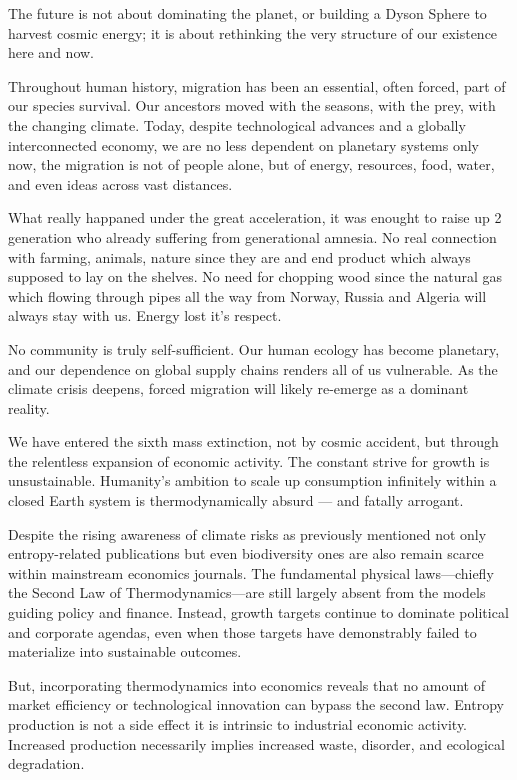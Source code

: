 \documentclass[a4paper,12pt]{article}
\begin{document}
The future is not about dominating the planet, or building a Dyson Sphere to harvest cosmic energy; it is about rethinking the very structure of our existence here and now.

Throughout human history, migration has been an essential, often forced, part of our species survival. Our ancestors moved with the seasons, with the prey, with the changing climate. Today, despite technological advances and a globally interconnected economy, we are no less dependent on planetary systems only now, the migration is not of people alone, but of energy, resources, food, water, and even ideas across vast distances.

What really happaned under the great acceleration, it was enought to raise up 2 generation who already suffering from generational amnesia. No real connection with farming, animals, nature since they are and end product which always supposed to lay on the shelves. No need for chopping wood since the natural gas which flowing through pipes all the way from Norway, Russia and Algeria will always stay with us. Energy lost it's respect. 

No community is truly self-sufficient. Our human ecology has become planetary, and our dependence on global supply chains renders all of us vulnerable. As the climate crisis deepens, forced migration will likely re-emerge as a dominant reality.

We have entered the sixth mass extinction, not by cosmic accident, but through the relentless expansion of economic activity. The constant strive for growth is unsustainable. Humanity’s ambition to scale up consumption infinitely within a closed Earth system is thermodynamically absurd — and fatally arrogant.

Despite the rising awareness of climate risks as previously mentioned not only entropy-related publications but even biodiversity ones are also remain scarce within mainstream economics journals. The fundamental physical laws—chiefly the Second Law of Thermodynamics—are still largely absent from the models guiding policy and finance. Instead, growth targets continue to dominate political and corporate agendas, even when those targets have demonstrably failed to materialize into sustainable outcomes.

But, incorporating thermodynamics into economics reveals that no amount of market efficiency or technological innovation can bypass the second law. Entropy production is not a side effect it is intrinsic to industrial economic activity. Increased production necessarily implies increased waste, disorder, and ecological degradation.
\end{document}
